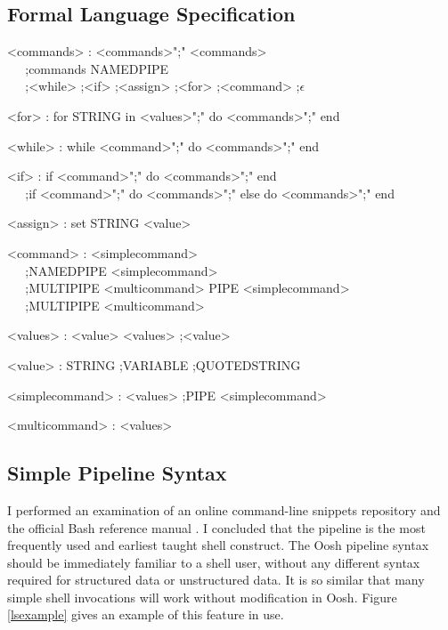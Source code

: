 \documentclass[12pt,twoside,notitlepage]{report}
\begin{document}
\subsection{Formal Language Specification}
\label{grammar}
\begin{grammar}
<commands> : <commands>";" <commands>\\
\textcolor{white}{tab};commands NAMEDPIPE\\
\textcolor{white}{tab};<while> ;<if> ;<assign> ;<for> ;<command> ;$\epsilon$

<for> : for STRING in <values>";" do <commands>";" end

<while> : while <command>";" do <commands>";" end

<if> : if <command>";" do <commands>";" end\\
\textcolor{white}{tab};if <command>";" do <commands>";" else do <commands>";" end

<assign> : set STRING <value>

<command> : <simplecommand>\\
\textcolor{white}{tab};NAMEDPIPE <simplecommand>\\
\textcolor{white}{tab};MULTIPIPE <multicommand> PIPE <simplecommand>\\
\textcolor{white}{tab};MULTIPIPE <multicommand>

<values> : <value> <values> ;<value>

<value> : STRING ;VARIABLE ;QUOTEDSTRING

<simplecommand> : <values>
;PIPE <simplecommand>
    
<multicommand> : <values>
\end{grammar}

\subsection{Simple Pipeline Syntax}

I performed an examination of an online command-line snippets
repository \cite{clifu} and the official Bash reference manual
\cite{bashman}. I concluded that the pipeline is the most frequently
used and earliest taught shell construct. The Oosh pipeline syntax
should be immediately familiar to a shell user, without any different
syntax required for structured data or unstructured data. It is so
similar that many simple shell invocations will work without modification in
Oosh. Figure \ref{lsexample} gives an example of this feature in use.
\end{document}
